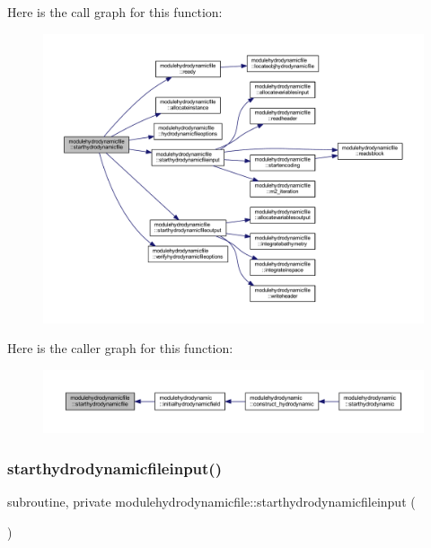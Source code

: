 Here is the call graph for this function\+:\nopagebreak
\begin{figure}[H]
\begin{center}
\leavevmode
\includegraphics[width=350pt]{namespacemodulehydrodynamicfile_afa04d9ff5074b735139f9addb9b466d7_cgraph}
\end{center}
\end{figure}
Here is the caller graph for this function\+:\nopagebreak
\begin{figure}[H]
\begin{center}
\leavevmode
\includegraphics[width=350pt]{namespacemodulehydrodynamicfile_afa04d9ff5074b735139f9addb9b466d7_icgraph}
\end{center}
\end{figure}
\mbox{\label{namespacemodulehydrodynamicfile_aab72ffaa67d987e2e0df7cd6249eac99}} 
\subsubsection{\texorpdfstring{starthydrodynamicfileinput()}{starthydrodynamicfileinput()}}
{\footnotesize\ttfamily subroutine, private modulehydrodynamicfile\+::starthydrodynamicfileinput (\begin{DoxyParamCaption}{ }\end{DoxyParamCaption})\hspace{0.3cm}{\ttfamily [private]}}


